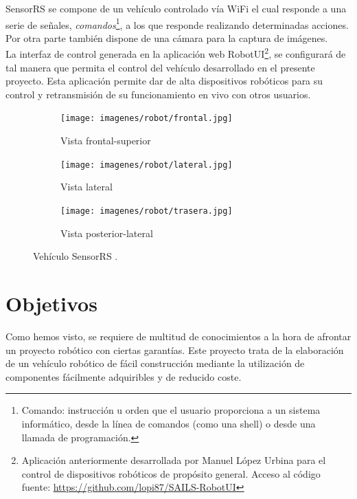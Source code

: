 SensorRS se compone de un vehículo controlado vía WiFi el cual responde a una serie de señales, \emph{comandos}\footnote{ Comando: instrucción u orden que el usuario proporciona a un sistema informático, 
desde la línea de comandos (como una shell) o desde una llamada de programación.}, a los que responde realizando determinadas acciones. Por otra parte también dispone de una cámara para la captura de imágenes.\\

La interfaz de control generada en la aplicación web RobotUI\footnote{ Aplicación anteriormente desarrollada por Manuel López Urbina para el control de dispositivos robóticos de propósito general. Acceso al 
código fuente: \url{https://github.com/lopi87/SAILS-RobotUI}}, se configurará de tal manera que permita el control del vehículo desarrollado en el presente proyecto. 
Esta aplicación permite dar de alta dispositivos robóticos para su control y retransmisión de su funcionamiento en vivo con otros usuarios.\\


\begin{figure}[H]
    \centering
    \begin{subfigure}[b]{0.4\textwidth}
        \texttt{[image: imagenes/robot/frontal.jpg]}
        \caption{Vista frontal-superior}
        \label{fig:gull}
    \end{subfigure}
    \begin{subfigure}[b]{0.5\textwidth}
        \texttt{[image: imagenes/robot/lateral.jpg]}
        \caption{Vista lateral}
        \label{fig:tiger}
    \end{subfigure}
    \begin{subfigure}[b]{0.5\textwidth}
        \texttt{[image: imagenes/robot/trasera.jpg]}
        \caption{Vista posterior-lateral}
        \label{fig:mouse}
    \end{subfigure}
    \caption{Vehículo SensorRS \protect\footnotemark.}\label{fig:animals}
\end{figure}




\section{Objetivos}
\label{sec:objetivos}

Como hemos visto, se requiere de multitud de conocimientos a la hora de afrontar un proyecto robótico con ciertas garantías. Este proyecto trata de la elaboración 
de un vehículo robótico de fácil construcción mediante la utilización de componentes fácilmente adquiribles y de reducido coste.\\

